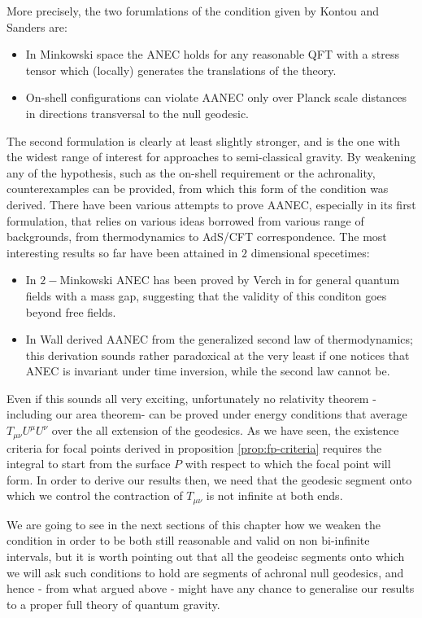 More precisely, the two forumlations of the condition given by Kontou and Sanders are:
\begin{itemize}
    \item[\ding{99}] In Minkowski space the ANEC holds for any reasonable QFT with a stress tensor which (locally) generates the translations of the theory.
    \item[\ding{99}] On-shell configurations can violate AANEC only over Planck scale distances in directions transversal to the null geodesic.
\end{itemize}
The second formulation is clearly at least slightly stronger, and is the one with the widest range of interest for approaches to semi-classical gravity. By weakening any of the hypothesis, such as the on-shell requirement or the achronality, counterexamples can be provided, from which this form of the condition was derived. 
There have been various attempts to prove AANEC, especially in its first formulation, that relies on various ideas borrowed from various range of backgrounds, from thermodynamics to AdS/CFT correspondence. The most interesting results so far have been attained in \(2\) dimensional specetimes:
\begin{itemize}
    \item[\ding{99}] In \(2-\)Minkowski ANEC has been proved by Verch in \cite[]{verch2000averaged} for general quantum fields with a mass gap, suggesting that the validity of this conditon goes beyond free fields.
    \item[\ding{99}] In \cite[]{wall2010proving} Wall derived AANEC from the generalized second law of thermodynamics; this derivation sounds rather paradoxical at the very least if one notices that ANEC is invariant under time inversion, while the second law cannot be.
\end{itemize}

Even if this sounds all very exciting, unfortunately no relativity theorem -including our area theorem- can be proved under energy conditions that average \(T_{\mu\nu}U^{\mu}U^{\nu}\) over the all extension of the geodesics. As we have seen, the existence criteria for focal points derived in proposition \ref{prop:fp-criteria} requires the integral to start from the surface \(P\) with respect to which the focal point will form. In order to derive our results then, we need that the geodesic segment onto which we control the contraction of \(T_{\mu\nu}\) is not infinite at both ends. 

\noindent
We are going to see in the next sections of this chapter how we weaken the condition in order to be both still reasonable and valid on non bi-infinite intervals, but it is worth pointing out that all the geodeisc segments onto which we will ask such conditions to hold are segments of achronal null geodesics, and hence - from what argued above - might have any chance to generalise our results to a proper full theory of quantum gravity.

